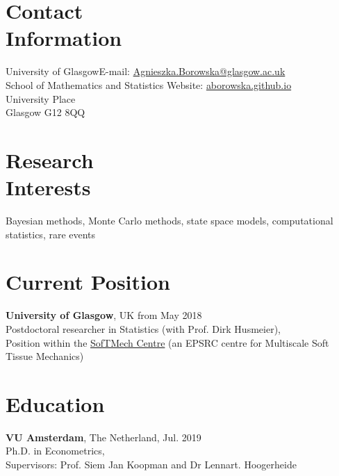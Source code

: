 \documentclass[margin,line]{resume}
\begin{document}
\begin{resume}
    \section{\mysidestyle Contact\\Information}
    University of Glasgow\hfill  E-mail: \url{Agnieszka.Borowska@glasgow.ac.uk} \\
    School of Mathematics and Statistics \hfill Website: \url{aborowska.github.io}\\ \vspace{0mm}%
    University Place \\
    Glasgow G12 8QQ\\ \vspace{-4.5mm}%
    \section{\mysidestyle Research\\Interests}
    
    Bayesian methods, Monte Carlo methods, state space models, computational statistics, rare events

 
    \section{\mysidestyle Current Position}
    \textbf{University of Glasgow},  UK \hfill from May 2018\\
	Postdoctoral researcher in Statistics (with Prof. Dirk Husmeier),\\ 
    Position within the \href{http://softmech.org/}{SofTMech Centre} (an EPSRC centre for Multiscale Soft Tissue Mechanics)

\vspace{-1mm}    
    \section{\mysidestyle Education}
    \textbf{VU Amsterdam},  The Netherland, \hfill Jul. 2019\\
	Ph.D. in Econometrics,\\ 
    Supervisors: Prof. Siem Jan Koopman and Dr Lennart. Hoogerheide
\vspace{-1mm}


\end{resume}
\end{document}
